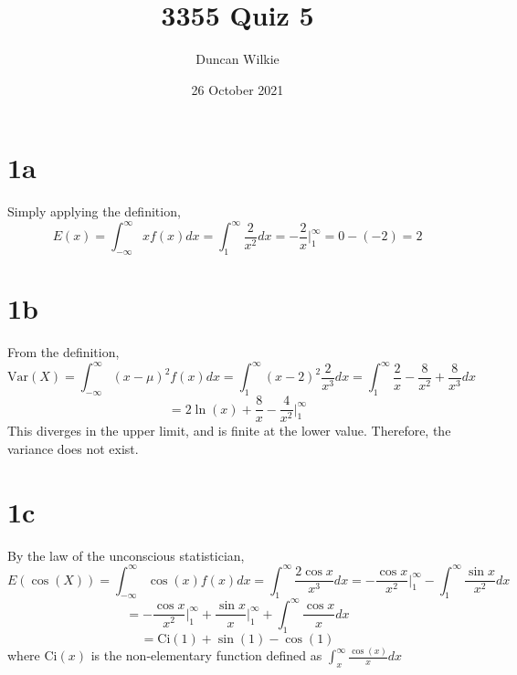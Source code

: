 \documentclass{article}
\title{3355 Quiz 5}
\author{Duncan Wilkie}
\date{26 October 2021}
\newcommand{\Var}{\mathrm{Var}}
\newcommand{\Ci}{\mathrm{Ci}}
\begin{document}
\maketitle

\section*{1a}
Simply applying the definition,
\[E(x)=\int_{-\infty}^\infty xf(x)dx=\int_1^\infty\frac{2}{x^2}dx=-\frac{2}{x}\bigg|_1^\infty=0-(-2)=2\]

\section*{1b}
From the definition,
\[\Var(X)=\int_{-\infty}^\infty (x-\mu)^2f(x)dx=\int_1^\infty(x-2)^2\frac{2}{x^3}dx=\int_1^\infty \frac{2}{x} - \frac{8}{x^2}+\frac{8}{x^3}dx\]
\[=2\ln(x)+\frac{8}{x}-\frac{4}{x^2}\bigg|_1^\infty\]
This diverges in the upper limit, and is finite at the lower value. Therefore, the variance does not exist.

\section*{1c}
By the law of the unconscious statistician,
\[E(\cos(X))=\int_{-\infty}^\infty\cos(x)f(x)dx=\int_{1}^\infty \frac{2\cos{x}}{x^3}dx=-\frac{\cos x}{x^2}\bigg|_1^\infty -\int_1^\infty\frac{ \sin{x}}{x^2}dx\]
\[=-\frac{\cos{x}}{x^2}\bigg|_1^\infty+\frac{\sin x}{x}\bigg|_1^\infty+\int_1^\infty \frac{\cos x}{x}dx\]
\[=\Ci(1)+\sin(1)-\cos(1)\]
where $\Ci(x)$ is the non-elementary function defined as $\int_x^\infty\frac{\cos(x)}{x}dx$
\end{document}
